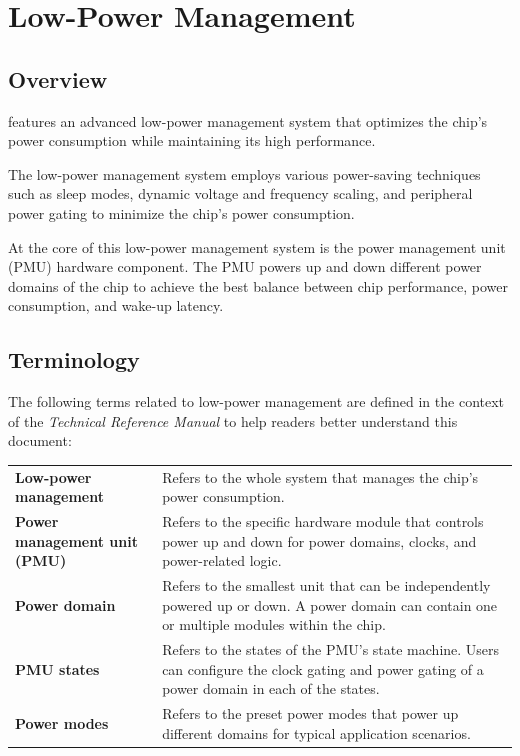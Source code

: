 \documentclass[main\_\_EN.tex]{subfiles}
\begin{document}

\ifglobal
\else
    {\let\clearpage\relax \listoftodos}
    {\let\clearpage\relax \listofdonetodos}
    \tableofcontents
\fi



\hypertarget{lowpowm}{}
\chapter{Low-Power Management}\label{mod:lowpowm}

\section{Overview}

\chipname{} features an advanced low-power management system that optimizes the chip's power consumption while maintaining its high performance.

The low-power management system employs various power-saving techniques such as sleep modes, dynamic voltage and frequency scaling, and peripheral power gating to minimize the chip's power consumption.

At the core of this low-power management system is the power management unit (PMU) hardware component. The PMU powers up and down different power domains of the chip to achieve the best balance between chip performance, power consumption, and wake-up latency.

\section{Terminology}

The following terms related to low-power management are defined in the context of the \textit{\chipname{} Technical Reference Manual}
to help readers better understand this document:

\begin{longtable}[c]{ R{6cm} p{10cm} }
\textbf{Low-power management} & Refers to the whole system that manages the chip's power consumption. \\
\textbf{Power management unit (PMU)} & Refers to the specific hardware module that controls power up and down for power domains, clocks, and power-related logic. \\
\textbf{Power domain} & Refers to the smallest unit that can be independently powered up or down. A power domain can contain one or multiple modules within the chip. \\
\textbf{PMU states} & Refers to the states of the PMU's state machine. Users can configure the clock gating and power gating of a power domain in each of the states.\\
\textbf{Power modes} & Refers to the preset power modes that power up different domains for typical application scenarios.\\
\end{longtable}
\end{document}
